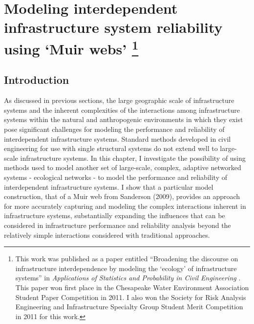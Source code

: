 
\chapter[Modeling interdependent infrastructure system reliability using `Muir webs']{Modeling interdependent infrastructure system reliability using `Muir webs' \footnote[10]{This work was published as a paper entitled ``Broadening the discourse on infrastructure interdependence by modeling the `ecology' of infrastructure systems'' in \emph{Applications of Statistics and Probability in Civil Engineering} \cite{LaRocca2011b}. This paper won first place in the Chesapeake Water Environment Association Student Paper Competition in 2011. I also won the Society for Risk Analysis Engineering and Infrastructure Specialty Group Student Merit Competition in 2011 for this work.}}
\label{ch4}


\section{Introduction}
\label{sec:ch4:intro}

As discussed in previous sections, the large geographic scale of infrastructure systems and the inherent complexities of the interactions among infrastructure systems within the natural and anthropogenic environments in which they exist pose significant challenges for modeling the performance and reliability of interdependent infrastructure systems. Standard methods developed in civil engineering for use with single structural systems do not extend well to large-scale infrastructure systems. In this chapter, I investigate the possibility of using methods used to model another set of large-scale, complex, adaptive networked systems - ecological networks - to model the performance and reliability of interdependent infrastructure systems. I show that a particular model construction, that of a Muir web from Sanderson (2009)\cite{Sanderson2009}, provides an approach for more accurately capturing and modeling the complex interactions inherent in infrastructure systems, substantially expanding the influences that can be considered in infrastructure performance and reliability analysis beyond the relatively simple interactions considered with traditional approaches.

